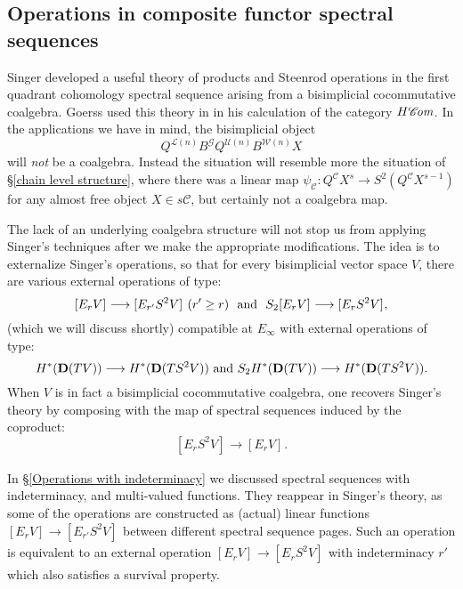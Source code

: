 \documentclass[11pt]{amsart} \renewcommand{\baselinestretch}{1.2}
\theoremstyle{plain}
\numberwithin{equation}{section} %
\theoremstyle{plain}
\numberwithin{equation}{chapter} %
\renewcommand{\to}{\longrightarrow}
\newcommand{\scrG}{\mathscr{G}}
\newcommand{\scrC}{\mathscr{C}}
\newcommand{\calU}{\mathcal{U}}
\newcommand{\calL}{\mathcal{L}}
\newcommand{\calw}{\mathcal{W}}
\newcommand{\calc}{\mathcal{C}}
\newcommand{\BSW}{{\scrG}}
\newcommand{\BSWres}{B^\BSW}%
\newcommand{\HA}[1]{H#1}
\newcommand{\algs}{{\scrC\!\textit{\normalfont\textit{om}}}}
\newcommand{\Edown}[4]{[E_{#1}#2]^{#3}_{#4}}
\newcommand{\EBdown}[4]{[B_{#1}#2]^{#3}_{#4}}
\newcommand{\dual}{\mathbf{D}}
\newcommand{\SectionOrChapter}[1]{\section{\textbf{#1}}}
\begin{document}
\begin{Operations in composite functor spectral sequences}
\SectionOrChapter{Operations in composite functor spectral sequences}
\label{Operations in composite functor spectral sequences}
Singer \cite{MR2245560} developed a useful theory of products and Steenrod operations in the first quadrant cohomology spectral sequence arising from a bisimplicial cocommutative coalgebra. Goerss used this theory in \cite[\S14]{MR1089001} in his calculation of the category $\HA{\algs}$.
 In the applications we have in mind, the bisimplicial object \[Q^{\calL(n)}\BSWres Q^{\calU(n)}{ B^{\calw(n)}X}\] 
will \emph{not} be a coalgebra. Instead the situation will resemble more the situation of \S\ref{chain level structure}, where there was a linear map $\psi_\calc:Q^{\calc}X^s\to S^2(Q^{\calc}X^{s-1})$ for any almost free object $X\in s\calc$, but certainly not a coalgebra map.


The lack of an underlying coalgebra structure will not stop us from applying Singer's techniques after we make the appropriate modifications. The idea is to externalize Singer's operations, so that for every bisimplicial vector space $V$, there are various external operations of type:
\[\Edown{r}{V}{}{}\to \Edown{r'}{S^2V}{}{}\ (r'\geq r)\textup{ \ and \ }S_2\Edown{r}{V}{}{}\to \Edown{r}{S^2V}{}{},\]
(which we will discuss shortly) compatible at $E_\infty$ with external operations of type:
\[H^*(\dual(TV))\to H^*(\dual(TS^2V))\textup{ and }S_2H^*(\dual(TV))\to H^*(\dual(TS^2V)).\]
When $V$ is  in fact a bisimplicial cocommutative coalgebra, one recovers Singer's theory by composing with the map of spectral sequences induced by the coproduct:
\[\Edown{r}{S^2V}{}{}\to \Edown{r}{V}{}{}.\]

In \S\ref{Operations with indeterminacy} we discussed spectral sequences with indeterminacy, and multi-valued functions.
They reappear in Singer's theory, as some of the operations are constructed as (actual) linear functions  $\Edown{r}{V}{}{}\to \Edown{r'}{S^2V}{}{}$ between different spectral sequence pages. 
Such an operation is equivalent to an external operation $\Edown{r}{V}{}{}\to \Edown{r}{S^2V}{}{}$ with indeterminacy $r'$ which also satisfies a survival property.


\end{Operations in composite functor spectral sequences}
\end{document}
